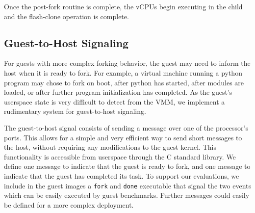 Once the post-fork routine is complete, the vCPUs begin executing in the child
and the flash-clone operation is complete.

\subsection{Guest-to-Host Signaling}

For guests with more complex forking behavior, the guest may need to inform the
host when it is ready to fork. For example, a virtual machine running a python
program may chose to fork on boot, after python has started, after modules are
loaded, or after further program initialization has completed. As the guest's
userspace state is very difficult to detect from the VMM, we implement a
rudimentary system for guest-to-host signaling.

The guest-to-host signal consists of sending a message over one of the
processor's ports. This allows for a simple and very efficient way to send
short messages to the host, without requiring any modifications to the guest
kernel. This functionality is accessible from userspace through the C standard
library. We define one message to indicate that the guest is ready to fork, and
one message to indicate that the guest has completed its task. To support our
evaluations, we include in the guest images a \texttt{fork} and \texttt{done}
executable that signal the two events which can be easily executed by guest
benchmarks. Further messages could easily be defined for a more complex
deployment.
